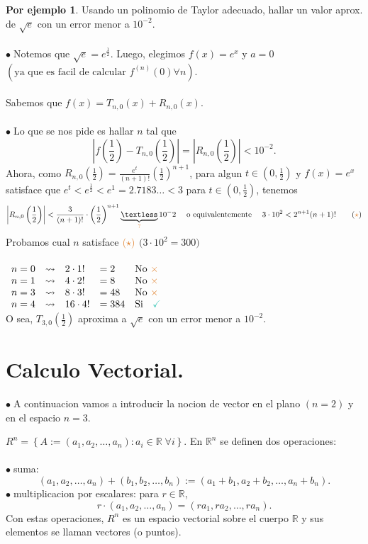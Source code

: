 \documentclass{article}
\theoremstyle{definition}
\newtheorem*{ej}{Por ejemplo}
\theoremstyle{remark}
\newcommand\bl{$\bullet\;$}
\newcommand\ok{\checkmark}
\begin{document}
\begin{ej}
  Usando un polinomio de Taylor adecuado, hallar un valor aprox. de $\sqrt{e}$ con un error menor a $10^{-2}$. \\\\
  \bl Notemos que $\sqrt{e}=e^{\frac{1}{2}}$. Luego, elegimos $f(x)=e^x$ y $a=0$ $\left(\text{ya que es facil de calcular } f^{(n)}(0) \forall n\right)$.
 \\\\
 Sabemos que $f(x)=T_{n,0}(x)+R_{n,0}(x).$ \\\\
 \bl Lo que se nos pide es hallar $n$ tal que \[ 
\left|f\left(\frac{1}{2}\right)-T_{n,0}\left(\frac{1}{2}\right)\right|=\left|R_{n,0}\left(\frac{1}{2}\right)\right| < 10^{-2}.
\]Ahora, como $R_{n,0}\left(\frac{1}{2}\right)=\frac{e^t}{(n+1)!}\left(\frac{1}{2}\right)^{n+1}$, para algun $t \in \left(0,\frac{1}{2}\right)$ y $f(x)=e^x$ satisface que $e^t < e^{\frac{1}{2}} < e^{1}=2.7183\dots < 3$ para $t \in \left(0,\frac{1}{2}\right)$, tenemos \[\left|R_{n,0}\left(\frac{1}{2}\right)\right|<\frac{3}{(n+1)!}\cdot \left(\frac{1}{2}\right)^{n+1} \underbrace{\textless}_{\textcolor{rojop2}{?}} 10^-2 \quad \text{ o equivalentemente } \quad  3 \cdot 10^2 < 2^{n+1}(n+1)! \quad \quad (\textcolor{rojop2}{\star})
\] Probamos cual $n$ satisface $\textcolor{rojop2}{(\star)}$ \quad $\big(3 \cdot 10^2 = 300\big)$ \\\\
$\begin{array}{lllll}
  n=0 & \rightsquigarrow & 2 \cdot 1! & = 2 & \text{No \textcolor{rojop2}{$\times$}} \\
  n=1 & \rightsquigarrow & 4 \cdot 2! & = 8 & \text{No \textcolor{rojop2}{$\times$}} \\
    n=3 & \rightsquigarrow & 8 \cdot 3! & = 48 & \text{No \textcolor{rojop2}{$\times$}} \\
    n=4 & \rightsquigarrow & 16 \cdot 4! & = 384 & \text{Si \; \textcolor{verdep2}{\ok}}
  \end{array}$ \\ O sea, $T_{3,0}\left(\frac{1}{2}\right)$ aproxima a $\sqrt{e}$ con un error menor a $10^{-2}$.
\end{ej}

\section{Calculo Vectorial.}
  
\bl A continuacion vamos a introducir la nocion de vector en el plano $(n=2)$ y en el espacio $n=3$. 
\begin{defi}
  $R^n=\left\{A:=(a_1,a_2, \dots , a_n): a_i \in \mathbb{R} \; \forall i\right\}$. En $\mathbb{R}^n$ se definen dos operaciones: \\\\
  \bl suma: $$(a_1,a_2, \dots ,a_n)+(b_1,b_2, \dots ,b_n):=(a_1+b_1, a_2+b_2, \dots , a_n+b_n).$$ 
  \bl multiplicacion por escalares: para $r \in \mathbb{R}$, $$r \cdot (a_1, a_2, \dots, a_n) = (ra_1, ra_2, \dots, ra_n).$$ 
  Con estas operaciones, $R^n$ es un espacio vectorial sobre el cuerpo $\mathbb{R}$ y sus elementos se llaman vectores (o puntos).
\end{defi}
\end{document}
